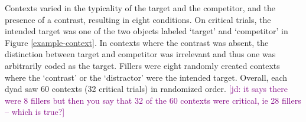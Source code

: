 \documentclass[10pt,letterpaper]{article}
\newcommand{\jd}[1]{\textcolor{Purple}{[jd: #1]}}
\newcommand{\figref}[1]{Figure \ref{#1}}
\begin{document}

Contexts varied in the typicality of the target and the competitor, and the presence of a contrast, resulting in eight conditions. On critical trials, the  intended target was one of the two objects labeled `target' and `competitor' in \figref{example-context}. In contexts where the contrast was absent, the distinction between target and competitor was irrelevant and thus one was arbitrarily coded as the target. Fillers were eight randomly created contexts where the `contrast' or the `distractor' were the intended target. Overall, each dyad saw 60 contexts (32 critical trials) in randomized order. \jd{it says there were 8 fillers but then you say that 32 of the 60 contexts were critical, ie 28 fillers -- which is true?}

\end{document}
